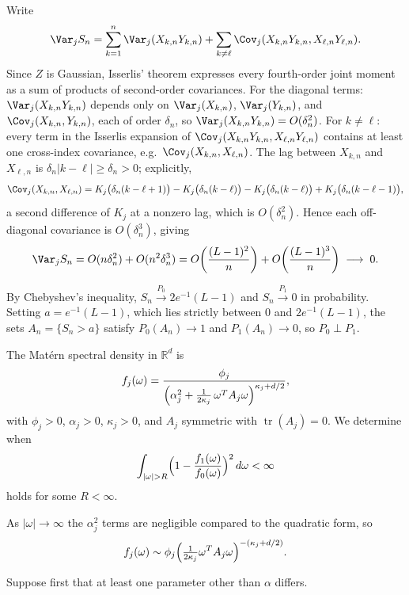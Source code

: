 \documentclass[answers,12pt,addpoints]{exam}
\begin{document}
\begin{questions}
\begin{solution}
Write
\[
\Var_j S_n
=\sum_{k=1}^n \Var_j(X_{k,n}Y_{k,n})
+\sum_{k\ne\ell}\Cov_j(X_{k,n}Y_{k,n},X_{\ell,n}Y_{\ell,n}).
\]
Since $Z$ is Gaussian, Isserlis' theorem expresses every fourth-order
joint moment as a sum of products of second-order covariances.
For the diagonal terms: $\Var_j(X_{k,n}Y_{k,n})$ depends only on
$\Var_j(X_{k,n})$, $\Var_j(Y_{k,n})$, and $\Cov_j(X_{k,n},Y_{k,n})$,
each of order $\delta_n$, so $\Var_j(X_{k,n}Y_{k,n})=O(\delta_n^2)$.
For $k\ne\ell$: every term in the Isserlis expansion of
$\Cov_j(X_{k,n}Y_{k,n},X_{\ell,n}Y_{\ell,n})$ contains at least one
cross-index covariance, e.g.\ $\Cov_j(X_{k,n},X_{\ell,n})$.
The lag between $X_{k,n}$ and $X_{\ell,n}$ is $\delta_n|k-\ell|\ge\delta_n>0$;
explicitly,
\[
\Cov_j(X_{k,n},X_{\ell,n})
= K_j\bigl(\delta_n(k-\ell+1)\bigr) - K_j\bigl(\delta_n(k-\ell)\bigr)
- K_j\bigl(\delta_n(k-\ell)\bigr) + K_j\bigl(\delta_n(k-\ell-1)\bigr),
\]
a second difference of $K_j$ at a nonzero lag, which is $O(\delta_n^2)$.
Hence each off-diagonal covariance is $O(\delta_n^3)$, giving
\[
\Var_j S_n
= O(n\delta_n^2)+O(n^2\delta_n^3)
= O\!\left(\frac{(L-1)^2}{n}\right)
 +O\!\left(\frac{(L-1)^3}{n}\right)
\;\longrightarrow\; 0.
\]

By Chebyshev's inequality, $S_n\xrightarrow{P_0}2e^{-1}(L-1)$ and
$S_n\xrightarrow{P_1}0$ in probability.
Setting $a=e^{-1}(L-1)$, which lies strictly between $0$ and
$2e^{-1}(L-1)$, the sets $A_n=\{S_n>a\}$ satisfy
$P_0(A_n)\to1$ and $P_1(A_n)\to0$, so $P_0\perp P_1$.
\end{solution}


\begin{solution}
The Matérn spectral density in $\mathbb{R}^d$ is
\[
f_j(\omega)
= \frac{\phi_j}{\Bigl(\alpha_j^2
  + \tfrac{1}{2\kappa_j}\,\omega^T A_j \omega\Bigr)^{\kappa_j + d/2}},
\]
with $\phi_j>0$, $\alpha_j>0$, $\kappa_j>0$, and $A_j$ symmetric with
$\operatorname{tr}(A_j)=0$.  We determine when
\[
\int_{|\omega|>R}
\Bigl(1-\frac{f_1(\omega)}{f_0(\omega)}\Bigr)^2\,d\omega < \infty
\]
holds for some $R<\infty$.

As $|\omega|\to\infty$ the $\alpha_j^2$ terms are negligible compared to
the quadratic form, so
\[
f_j(\omega)\sim
\phi_j\Bigl(\tfrac{1}{2\kappa_j}\omega^T A_j\omega\Bigr)^{-(\kappa_j+d/2)}.
\]

Suppose first that at least one parameter other than $\alpha$ differs.


\end{solution}
\end{questions}
\end{document}

